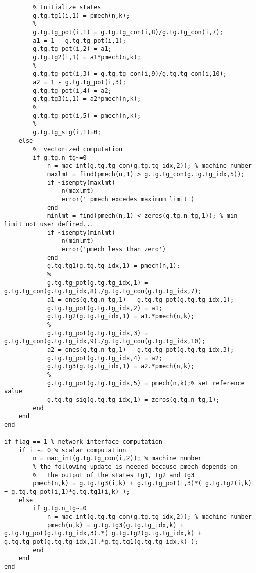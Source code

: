 \documentclass[12pt]{article}
\begin{document}
\begin{verbatim}
        % Initialize states
        g.tg.tg1(i,1) = pmech(n,k);
        %
        g.tg.tg_pot(i,1) = g.tg.tg_con(i,8)/g.tg.tg_con(i,7);
        a1 = 1 - g.tg.tg_pot(i,1);
        g.tg.tg_pot(i,2) = a1;
        g.tg.tg2(i,1) = a1*pmech(n,k);
        %
        g.tg.tg_pot(i,3) = g.tg.tg_con(i,9)/g.tg.tg_con(i,10);
        a2 = 1 - g.tg.tg_pot(i,3);
        g.tg.tg_pot(i,4) = a2;
        g.tg.tg3(i,1) = a2*pmech(n,k);
        %
        g.tg.tg_pot(i,5) = pmech(n,k);
        %
        g.tg.tg_sig(i,1)=0;
    else
        %  vectorized computation
        if g.tg.n_tg~=0
            n = mac_int(g.tg.tg_con(g.tg.tg_idx,2)); % machine number
            maxlmt = find(pmech(n,1) > g.tg.tg_con(g.tg.tg_idx,5));
            if ~isempty(maxlmt)
                n(maxlmt)
                error(' pmech excedes maximum limit')
            end
            minlmt = find(pmech(n,1) < zeros(g.tg.n_tg,1)); % min limit not user defined...
            if ~isempty(minlmt)
                n(minlmt)
                error('pmech less than zero')
            end
            g.tg.tg1(g.tg.tg_idx,1) = pmech(n,1);
            %
            g.tg.tg_pot(g.tg.tg_idx,1) = g.tg.tg_con(g.tg.tg_idx,8)./g.tg.tg_con(g.tg.tg_idx,7);
            a1 = ones(g.tg.n_tg,1) - g.tg.tg_pot(g.tg.tg_idx,1);
            g.tg.tg_pot(g.tg.tg_idx,2) = a1;
            g.tg.tg2(g.tg.tg_idx,1) = a1.*pmech(n,k);
            %
            g.tg.tg_pot(g.tg.tg_idx,3) = g.tg.tg_con(g.tg.tg_idx,9)./g.tg.tg_con(g.tg.tg_idx,10);
            a2 = ones(g.tg.n_tg,1) - g.tg.tg_pot(g.tg.tg_idx,3);
            g.tg.tg_pot(g.tg.tg_idx,4) = a2;
            g.tg.tg3(g.tg.tg_idx,1) = a2.*pmech(n,k);
            %
            g.tg.tg_pot(g.tg.tg_idx,5) = pmech(n,k);% set reference value
            g.tg.tg_sig(g.tg.tg_idx,1) = zeros(g.tg.n_tg,1);
        end
    end
end

if flag == 1 % network interface computation
    if i ~= 0 % scalar computation
        n = mac_int(g.tg.tg_con(i,2)); % machine number
        % the following update is needed because pmech depends on
        %   the output of the states tg1, tg2 and tg3
        pmech(n,k) = g.tg.tg3(i,k) + g.tg.tg_pot(i,3)*( g.tg.tg2(i,k) + g.tg.tg_pot(i,1)*g.tg.tg1(i,k) );
    else
        if g.tg.n_tg~=0
            n = mac_int(g.tg.tg_con(g.tg.tg_idx,2)); % machine number
            pmech(n,k) = g.tg.tg3(g.tg.tg_idx,k) + g.tg.tg_pot(g.tg.tg_idx,3).*( g.tg.tg2(g.tg.tg_idx,k) + g.tg.tg_pot(g.tg.tg_idx,1).*g.tg.tg1(g.tg.tg_idx,k) );
        end
    end
end


\end{verbatim}
\end{document}
